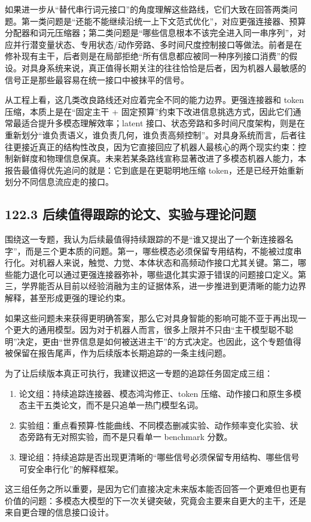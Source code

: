 如果进一步从“替代串行词元接口”的角度理解这些路线，它们大致在回答两类问题。第一类问题是“还能不能继续沿统一上下文范式优化”，对应更强连接器、预算分配器和词元压缩器；第二类问题是“哪些信息根本不该完全进入同一串序列”，对应并行潜变量状态、专用状态/动作旁路、多时间尺度控制接口等做法。前者是在修补现有主干，后者则是在局部拒绝“所有信息都应被同一种序列接口消费”的假设。对具身系统来说，真正值得长期关注的往往恰恰是后者，因为机器人最敏感的信号正是那些最容易在统一接口中被抹平的信号。

从工程上看，这几类改良路线还对应着完全不同的能力边界。更强连接器和 token 压缩，本质上是在“固定主干 + 固定预算”约束下改进信息挑选方式，因此它们通常最适合提升多模态理解效率；latent 接口、状态旁路和多时间尺度架构，则是在重新划分“谁负责语义，谁负责几何，谁负责高频控制”。对具身系统而言，后者往往更接近真正的结构性改良，因为它直接回应了机器人最核心的两个现实约束：控制新鲜度和物理信息保真。未来若某条路线宣称显著改进了多模态机器人能力，本报告最值得优先追问的就是：它到底是在更聪明地压缩 token，还是已经开始重新划分不同信息流应走的接口。

\subsection*{122.3 后续值得跟踪的论文、实验与理论问题}


围绕这一专题，我认为后续最值得持续跟踪的不是“谁又提出了一个新连接器名字”，而是三个更本质的问题。第一，哪些模态必须保留专用结构，不能被过度串行化。对机器人来说，触觉、力觉、本体状态和高频动作接口尤其关键。第二，哪些能力退化可以通过更强连接器弥补，哪些退化其实源于错误的问题接口定义。第三，学界能否从目前以经验消融为主的证据体系，进一步推进到更清晰的能力边界解释，甚至形成更强的理论约束。

如果这些问题未来获得更明确答案，那么它对具身智能的影响可能不亚于再出现一个更大的通用模型。因为对于机器人而言，很多上限并不只由“主干模型聪不聪明”决定，更由“世界信息是如何被送进主干”的方式决定。也因此，这个专题值得被保留在报告尾声，作为后续版本长期追踪的一条主线问题。

为了让后续版本真正可执行，我建议把这一专题的追踪任务固定成三组：

\begin{enumerate}
\item 论文组：持续追踪连接器、模态鸿沟修正、token 压缩、动作接口和原生多模态主干五类论文，而不是只追单一热门模型名词。
\item 实验组：重点看预算-性能曲线、不同模态删减实验、动作频率变化实验、状态旁路有无对照实验，而不是只看单一 benchmark 分数。
\item 理论组：持续追踪是否出现更清晰的“哪些信号必须保留专用结构、哪些信号可安全串行化”的解释框架。
\end{enumerate}

这三组任务之所以重要，是因为它们直接决定未来版本能否回答一个更难但也更有价值的问题：多模态大模型的下一次关键突破，究竟会主要来自更大的主干，还是来自更合理的信息接口设计。
